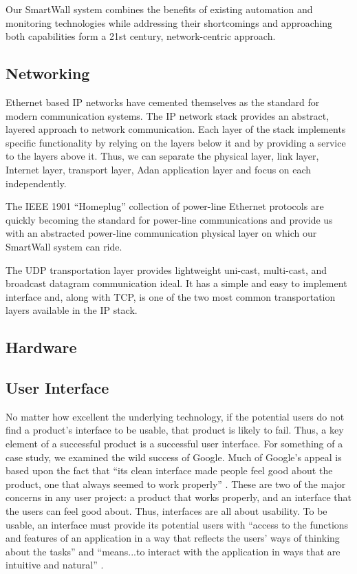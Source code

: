 \documentclass[12pt]{article}
\begin{document}
Our SmartWall system combines the benefits of existing automation and
monitoring technologies while addressing their shortcomings and
approaching both capabilities form a 21st century, network-centric approach.

\subsection{Networking}
Ethernet based IP networks have cemented themselves as the standard
for modern communication systems. The IP network stack provides an
abstract, layered approach to network communication. Each layer of the
stack implements specific functionality by relying on the layers below
it and by providing a service to the layers above it. Thus, we can
separate the physical layer, link layer, Internet layer, transport
layer, Adan application layer and focus on each independently.

The IEEE 1901 ``Homeplug'' collection of power-line Ethernet protocols are
quickly becoming the standard for power-line communications and provide
us with an abstracted power-line communication physical layer on which our
SmartWall system can ride.

The UDP transportation layer provides lightweight uni-cast, multi-cast, and
broadcast datagram communication ideal. It has a simple and easy to
implement interface and, along with TCP, is one of the two most common
transportation layers available in the IP stack.

\subsection{Hardware}

\subsection{User Interface}
No matter how excellent the underlying technology, if the potential
users do not find a product’s interface to be usable, that product is
likely to fail. Thus, a key element of a successful product is a
successful user interface. For something of a case study, we examined the
wild success of Google. Much of Google's appeal is based upon the fact
that “its clean interface made people feel good about the product,
one that always seemed to work properly” \cite{googleStory}. These are
two of the major concerns in any user project: a product that works
properly, and an
interface that the users can feel good about. Thus, interfaces are
all about usability. To be usable, an interface must provide its
potential users with “access to the functions and features of an
application in a way that reflects the users’ ways of thinking about
the tasks” and “means...to interact with the application in ways that
are intuitive and natural” \cite{UIDesign}.
\end{document}
